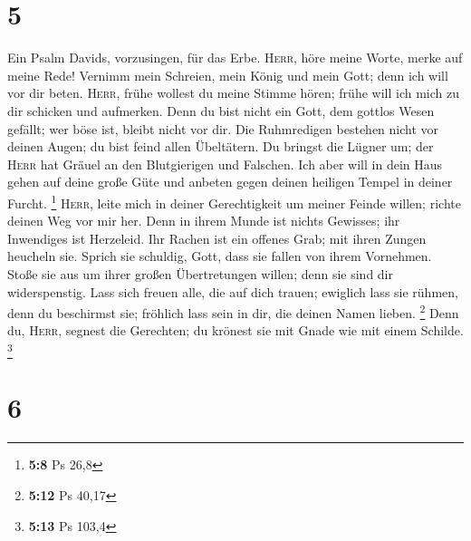 \hypertarget{section-3}{%
\section{5}\label{section-3}}

 Ein Psalm Davids, vorzusingen, für das Erbe.
 \textsc{Herr}, höre meine Worte, merke auf meine Rede!
 Vernimm mein Schreien, mein König und mein Gott; denn ich
will vor dir beten.  \textsc{Herr}, frühe wollest du meine
Stimme hören; frühe will ich mich zu dir schicken und aufmerken.
 Denn du bist nicht ein Gott, dem gottlos Wesen gefällt;
wer böse ist, bleibt nicht vor dir.  Die Ruhmredigen
bestehen nicht vor deinen Augen; du bist feind allen Übeltätern.
 Du bringst die Lügner um; der \textsc{Herr} hat Gräuel an
den Blutgierigen und Falschen.  Ich aber will in dein Haus
gehen auf deine große Güte und anbeten gegen deinen heiligen Tempel in
deiner Furcht. \footnote{\textbf{5:8} Ps 26,8} 
\textsc{Herr}, leite mich in deiner Gerechtigkeit um meiner Feinde
willen; richte deinen Weg vor mir her.  Denn in ihrem
Munde ist nichts Gewisses; ihr Inwendiges ist Herzeleid. Ihr Rachen ist
ein offenes Grab; mit ihren Zungen heucheln sie.  Sprich
sie schuldig, Gott, dass sie fallen von ihrem Vornehmen. Stoße sie aus
um ihrer großen Übertretungen willen; denn sie sind dir widerspenstig.
 Lass sich freuen alle, die auf dich trauen; ewiglich
lass sie rühmen, denn du beschirmst sie; fröhlich lass sein in dir, die
deinen Namen lieben. \footnote{\textbf{5:12} Ps 40,17} 
Denn du, \textsc{Herr}, segnest die Gerechten; du krönest sie mit Gnade
wie mit einem Schilde. \footnote{\textbf{5:13} Ps 103,4}

\hypertarget{section-4}{%
\section{6}\label{section-4}}


